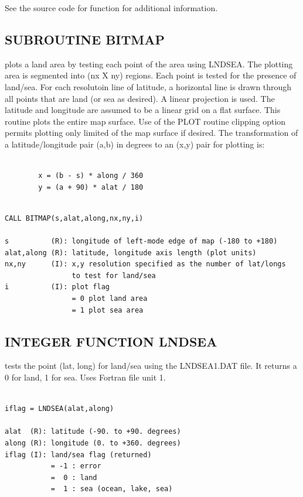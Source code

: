 \documentclass[11pt]{report}
\begin{document}
See the source code for  function for additional information.

\subsection{SUBROUTINE BITMAP}

 plots a land area by testing each point of the area using LNDSEA.
The plotting area is segmented into (nx X ny) regions.  Each point is
tested for the presence of land/sea.  For each resolutoin line of
latitude, a horizontal line is drawn through all points that are land
(or sea as desired).  A linear projection is used.  The latitude and
longitude are assumed to be a linear grid on a flat surface.  This
routine plots the entire map surface.  Use of the PLOT routine
clipping option permits plotting only limited of the map surface
if desired.  The transformation of a latitude/longitude pair (a,b) in
degrees to an (x,y) pair for plotting is:
\begin{verbatim}

        x = (b - s) * along / 360
        y = (a + 90) * alat / 180
\end{verbatim}
\begin{verbatim}

CALL BITMAP(s,alat,along,nx,ny,i)

s          (R): longitude of left-mode edge of map (-180 to +180)
alat,along (R): latitude, longitude axis length (plot units)
nx,ny      (I): x,y resolution specified as the number of lat/longs
                to test for land/sea
i          (I): plot flag
                = 0 plot land area
                = 1 plot sea area
\end{verbatim}

\subsection{INTEGER FUNCTION LNDSEA}

 tests the point (lat, long) for land/sea using the LNDSEA1.DAT file.
It returns a 0 for land, 1 for sea.  Uses Fortran file unit 1.
\begin{verbatim}

iflag = LNDSEA(alat,along)

alat  (R): latitude (-90. to +90. degrees)
along (R): longitude (0. to +360. degrees)
iflag (I): land/sea flag (returned)
           = -1 : error
           =  0 : land
           =  1 : sea (ocean, lake, sea)
\end{verbatim}
\end{document}
